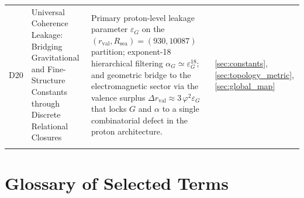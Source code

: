 \documentclass{article}
\begin{document}
\begin{longtable}{@{}p{0.9cm}L{5cm}L{5cm}p{4.4cm}@{}}
  D20 &
  Universal Coherence Leakage: Bridging Gravitational and Fine-Structure Constants through Discrete Relational Closures &
  Primary proton-level leakage parameter $\varepsilon_G$ on the $(r_{\mathrm{val}},R_{\mathrm{sea}})=(930,10087)$ partition; exponent-18 hierarchical filtering $\alpha_G \simeq \varepsilon_G^{18}$; and geometric bridge to the electromagnetic sector via the valence surplus $\Delta r_{\mathrm{val}} \approx 3\,\varphi^2 \varepsilon_G$ that locks $G$ and $\alpha$ to a single combinatorial defect in the proton architecture. &
  \ref{sec:constants}, \ref{sec:topology_metric}, \ref{sec:global_map} \\\\[0.4em]

\end{longtable}

\section{Glossary of Selected Terms}
\label{app:glossary}
\end{document}
